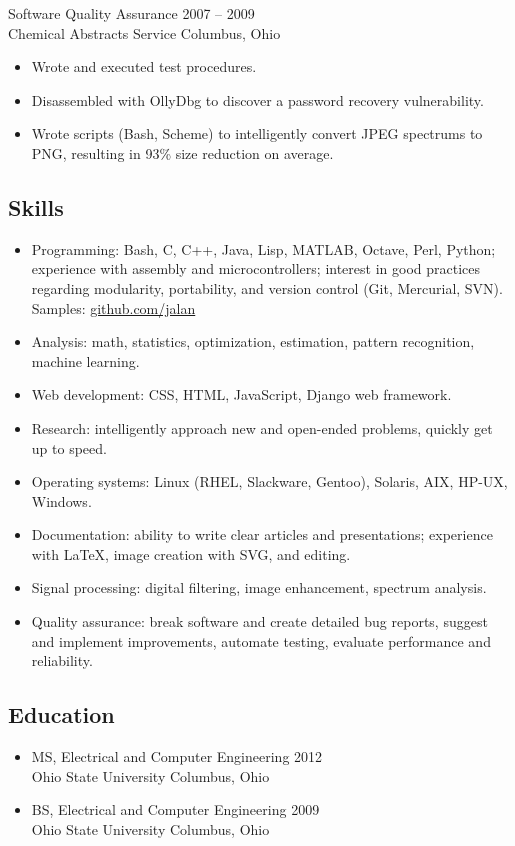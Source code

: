 \documentclass[12pt]{report}
\begin{document}
Software Quality Assurance                              \hfill 2007 -- 2009 \\
Chemical Abstracts Service                              \hfill Columbus, Ohio
\begin{itemize}
\item Wrote and executed test procedures.
\item Disassembled with OllyDbg to discover a password recovery vulnerability.
\item Wrote scripts (Bash, Scheme) to intelligently convert JPEG spectrums to PNG, resulting in 93\% size reduction on average.
\end{itemize}

\subsection*{Skills}
\begin{itemize}
\item Programming: Bash, C, C++, Java, Lisp, MATLAB, Octave, Perl, Python; experience with assembly and microcontrollers; interest in good practices regarding modularity, portability, and version control (Git, Mercurial, SVN). Samples: \href{http://github.com/jalan}{github.com/jalan}
\item Analysis: math, statistics, optimization, estimation, pattern recognition, machine learning.
\item Web development: CSS, HTML, JavaScript, Django web framework.
\item Research: intelligently approach new and open-ended problems, quickly get up to speed.
\item Operating systems: Linux (RHEL, Slackware, Gentoo), Solaris, AIX, HP-UX, Windows.
\item Documentation: ability to write clear articles and presentations; experience with \LaTeX, image creation with SVG, and editing.
\item Signal processing: digital filtering, image enhancement, spectrum analysis.
\item Quality assurance: break software and create detailed bug reports, suggest and implement improvements, automate testing, evaluate performance and reliability.
\end{itemize}

\subsection*{Education}
\begin{itemize}
\item MS, Electrical and Computer Engineering \hfill 2012 \\
Ohio State University                         \hfill Columbus, Ohio \\

\item BS, Electrical and Computer Engineering \hfill 2009 \\
Ohio State University                         \hfill Columbus, Ohio \\
\end{itemize}
\end{document}
